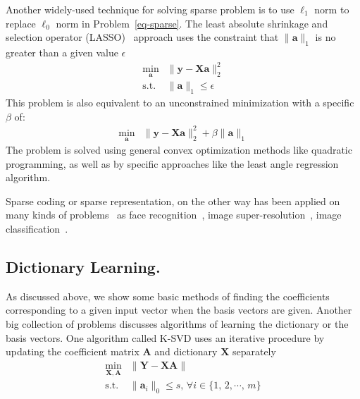 Another widely-used technique for solving sparse problem is to use $\ell_1$ norm to replace $\ell_0$ norm in Problem~\ref{eq-sparse}.
The least absolute shrinkage and selection operator (LASSO)~\cite{tibshirani1996regression} approach uses the constraint that $\|\mathbf{a}\|_1$ is no greater than a given value $\epsilon$
\begin{equation}
\begin{array}{cl}
\min_{\mathbf{a}} & \|\mathbf{y}-\mathbf{X}\mathbf{a}\|_2^2\\
\mathrm{s.t.} & \|\mathbf{a}\|_1 \leq \epsilon
\end{array}
\end{equation}
This problem is also equivalent to an unconstrained minimization with a specific $\beta$ of:
\begin{equation}
\begin{array}{cl}
\min_{\mathbf{a}} & \|\mathbf{y}-\mathbf{X}\mathbf{a}\|_2^2 + \beta \|\mathbf{a}\|_1
\end{array}
\end{equation}
The problem is solved using general convex optimization methods like quadratic programming, as well as by specific approaches like the least angle regression~\cite{efron2004least} algorithm.

Sparse coding or sparse representation, on the other way has been applied on many kinds of problems~\cite{wright2010sparse} as face recognition~\cite{wright2009robust}, image super-resolution~\cite{yang2008image}, image classification~\cite{mairal2008discriminative}.

\subsection{Dictionary Learning.}
As discussed above, we show some basic methods of finding the coefficients corresponding to a given input vector when the basis vectors are given.
Another big collection of problems discusses algorithms of learning the dictionary or the basis vectors.
One algorithm called K-SVD uses an iterative procedure by updating the coefficient matrix $\mathbf{A}$ and dictionary $\mathbf{X}$ separately
\begin{equation}
\begin{array}{cl}
\min_{\mathbf{X},\mathbf{A}} & \|\mathbf{Y}-\mathbf{X}\mathbf{A}\| \\
\mathrm{s.t.} & \|\mathbf{a}_i\|_0 \leq s,\,\forall i\in\{1,\,2,\cdots ,\,m\}
\end{array}
\end{equation}

